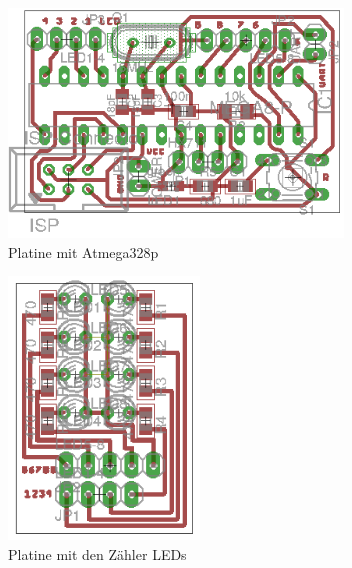 \documentclass[12pt,journal]{IEEEtran}
\begin{document}
\begin{figure}[htbp]
  \centering
    \includegraphics[width=3.5in]{images/atmega328p_platine.png}
    \caption{Platine mit Atmega328p}
  \label{fig_atmega328p_platine}
\end{figure}

\begin{figure}[htbp]
  \centering
    \includegraphics[width=2.0in]{images/LED_Platine.png}
    \caption{Platine mit den Zähler LEDs}
  \label{fig_LED_Platine}
\end{figure}


\end{document}
